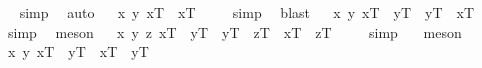 \begin{isabellebody}
\isadelimproof
\ %
\endisadelimproof
%
\isatagproof
{}\isamarkupfalse%
\ simp\ \isamarkupfalse%
\ auto%
\endisatagproof
{\isafoldproof}%
%
\isadelimproof
%
\endisadelimproof
%
\isamarkuptrue%
\ \isamarkupfalse%
\ {\isachardoublequoteopen}{\isacharbrackleft}{\isacharparenleft}\isactrlbold {\isasymforall}x\ y{\isachardot}\ {\isacharparenleft}x\isactrlsup T\ \isactrlbold {\isacharequal}\ x\isactrlsup T{\isacharparenright}{\isacharparenright}{\isacharbrackright}\ {\isacharequal}\ {\isasymtop}{\isachardoublequoteclose}%
\isadelimproof
\ %
\endisadelimproof
%
\isatagproof
{}\isamarkupfalse%
\ simp\ \isamarkupfalse%
\ blast%
\endisatagproof
{\isafoldproof}%
%
\isadelimproof
%
\endisadelimproof
\isanewline
\ \isamarkupfalse%
\ {\isachardoublequoteopen}{\isacharbrackleft}{\isacharparenleft}\isactrlbold {\isasymforall}x\ y{\isachardot}\ x\isactrlsup T\ \isactrlbold {\isacharequal}\ y\isactrlsup T\ \isactrlbold {\isasymrightarrow}\ y\isactrlsup T\ \isactrlbold {\isacharequal}\ x\isactrlsup T{\isacharparenright}{\isacharbrackright}\ {\isacharequal}\ {\isasymtop}{\isachardoublequoteclose}%
\isadelimproof
\ %
\endisadelimproof
%
\isatagproof
{}\isamarkupfalse%
\ simp\ \isamarkupfalse%
\ meson%
\endisatagproof
{\isafoldproof}%
%
\isadelimproof
%
\endisadelimproof
\isanewline
\ \isamarkupfalse%
\ {\isachardoublequoteopen}{\isacharbrackleft}{\isacharparenleft}\isactrlbold {\isasymforall}x\ y\ z{\isachardot}\ {\isacharparenleft}x\isactrlsup T\ \isactrlbold {\isacharequal}\ y\isactrlsup T\ \isactrlbold {\isasymand}\ y\isactrlsup T\ \isactrlbold {\isacharequal}\ z\isactrlsup T{\isacharparenright}\ \isactrlbold {\isasymrightarrow}\ x\isactrlsup T\ \isactrlbold {\isacharequal}\ z\isactrlsup T{\isacharparenright}{\isacharbrackright}\ {\isacharequal}\ {\isasymtop}{\isachardoublequoteclose}%
\isadelimproof
\ %
\endisadelimproof
%
\isatagproof
{}\isamarkupfalse%
\ simp\ \ \isamarkupfalse%
\ meson%
\endisatagproof
{\isafoldproof}%
%
\isadelimproof
%
\endisadelimproof
\ \isanewline
\ \isamarkupfalse%
\ {\isachardoublequoteopen}{\isacharbrackleft}{\isacharparenleft}\isactrlbold {\isasymforall}x\ y{\isachardot}\ {\isacharparenleft}x\isactrlsup T\ \isactrlbold {\isacharequal}\ y\isactrlsup T\ \isactrlbold {\isasymrightarrow}\ \isactrlbold {\isasymbox}{\isacharparenleft}x\isactrlsup T\ \isactrlbold {\isacharequal}\ y\isactrlsup T{\isacharparenright}{\isacharparenright}{\isacharparenright}{\isacharbrackright}\ {\isacharequal}\ {\isasymtop}{\isachardoublequoteclose}%

\end{isabellebody}
